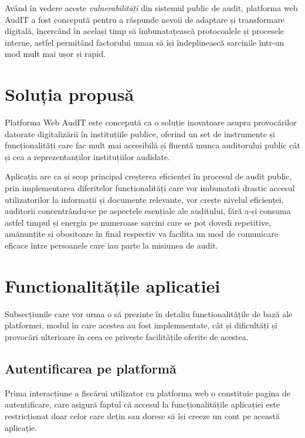 \par  Având în vedere aceste \textit{vulnerabilități} din sistemul public de audit, platforma web AudIT a fost concepută pentru a răspunde nevoii de adaptare și transformare digitală, încercând în același timp să îmbunatațească protocoalele și procesele interne, astfel permitând factorului uman să își îndeplinească sarcinile într-un mod mult mai ușor și rapid.

\section{Soluția propusă}
Platforma Web AudIT este concepută ca o soluție inovatoare asupra provocărilor datorate digitalizării în instituțiile publice, oferind un set de instrumente și funcționalități care fac mult mai accesibilă și fluentă  munca auditorului public cât și cea a reprezentanților instituțiilor audidate.

\par Aplicația are ca și scop principal creșterea eficienței în procesul de audit public, prin implementarea diferitelor functionalități care vor imbunatati drastic accesul utilizatorilor la informații și documente relevante, vor crește nivelul eficienței, auditorii concentrându-se pe aspectele esențiale ale auditului, fără a-și consuma  astfel timpul și energia pe numeroase sarcini care se pot dovedi repetitive, amănunțite si obositoare în final respectiv va facilita un mod de comunicare eficace între persoanele care iau parte la misiunea de audit.



\section{Functionalitățile aplicatiei}
Subsecțiunile care vor urma o să prezinte în detaliu functionalitățile de bază ale platformei,
modul în care acestea au fost implemnentate, cât și dificultăți și provocări ulterioare în ceea ce privește facilitățile oferite de acestea.

\subsection{Autentificarea pe platformă}
Prima interacțiune a fiecărui utilizator cu platforma web o constituie pagina de autentificare, care asigură faptul că accesul la funcționalitățile aplicației este restricționat doar celor care dețin sau doresc să își creeze un cont pe această aplicație.

